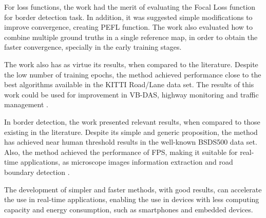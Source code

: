 For loss functions, the work had the merit of evaluating the Focal Loss \cite{Lin:2017} function for border detection task.
In addition, it was suggested simple modifications to improve convergence, creating PEFL function.
The work also evaluated how to combine multiple ground truths in a single reference map, in order to obtain the faster convergence, specially in the early training stages.

The work also has as virtue its results, when compared to the literature.
Despite the low number of training epochs, the method achieved performance close to the best algorithms available in the KITTI Road/Lane data set.
The results of this work could be used for improvement in VB-DAS, highway monitoring and traffic management \cite{Reis:2019}.

In border detection, the work presented relevant results, when compared to those existing in the literature.
Despite its simple and generic proposition, the method has achieved near human threshold results in the well-known BSDS500 data set.
Also, the method achieved the performance of \myFPS FPS, making it suitable for real-time applications, as microscope images information extraction and road boundary detection \cite{Qu:2020} \cite{Li:2020} \cite{Perng:2020}.

The development of simpler and faster methods, with good results, can accelerate the use in real-time applications, enabling the use in devices with less computing capacity and energy consumption, such as smartphones and embedded devices.


